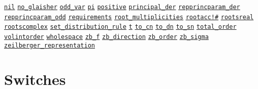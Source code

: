 \begin{list}{}
\hyperlink{reserved:NIL}{\texttt{nil}}
\hyperlink{reserved:NO_GLAISHER}{\texttt{no\_glaisher}}
\hyperlink{variable:ODD_VAR}{\texttt{odd\_var}}
\hyperlink{reserved:PI}{\texttt{pi}}
\hyperlink{reserved:POSITIVE}{\texttt{positive}}
\hyperlink{variable:PRINCIPAL_DER}{\texttt{principal\_der}}
\hyperlink{variable:RATES}{}
\hyperlink{variable:REPPRINCPARAM_DER}{\texttt{repprincparam\_der}}
\hyperlink{variable:REPPRINCPARAM_ODD}{\texttt{repprincparam\_odd}}
\hyperlink{reserved:requirements}{\texttt{requirements}}
\hyperlink{reserved:ROOT_MULTIPLICITIES}{\texttt{root\_multiplicities}}
\hyperlink{reserved:ROOTACC}{\texttt{rootacc!\#}}
\hyperlink{reserved:ROOTSREAL}{\texttt{rootsreal}}
\hyperlink{reserved:ROOTSCOMPLEX}{\texttt{rootscomplex}}
\hyperlink{reserved:SET_DISTRIBUTION_RULE}{\texttt{set\_distribution\_rule}}
\hyperlink{variable:SPECIES}{}
\hyperlink{reserved:T}{\texttt{t}}
\hyperlink{reserved:TO_CN}{\texttt{to\_cn}}
\hyperlink{reserved:TO_DN}{\texttt{to\_dn}}
\hyperlink{reserved:TO_SN}{\texttt{to\_sn}}
\hyperlink{variable:TOTAL_ORDER}{\texttt{total\_order}}
\hyperlink{reserved:VOLINTORDER}{\texttt{volintorder}}
\hyperlink{reserved:WHOLESPACE}{\texttt{wholespace}}
\hyperlink{reserved:ZB_F}{\texttt{zb\_f}}
\hyperlink{reserved:ZB_DIRECTION}{\texttt{zb\_direction}}
\hyperlink{reserved:ZB_ORDER}{\texttt{zb\_order}}
\hyperlink{reserved:ZB_SIGMA}{\texttt{zb\_sigma}}
\hyperlink{reserved:ZEILBERGER_REPRESENTATION}{\texttt{zeilberger\_representation}}
\halfinterwordspace

\section{Switches}


\end{list}
